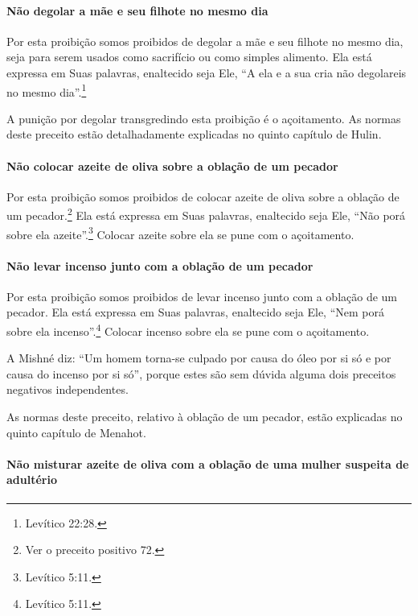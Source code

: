 \paragraph{Não degolar a mãe e seu filhote no mesmo dia}

Por esta proibição somos proibidos de degolar a mãe e seu filhote no
mesmo dia, seja para serem usados como sacrifício ou como simples
alimento. Ela está expressa em Suas palavras, enaltecido seja Ele, ``A
ela e a sua cria não degolareis no mesmo dia''.\footnote{Levítico 22:28.}

A punição por degolar transgredindo esta proibição é o açoitamento. As
normas deste preceito estão detalhadamente explicadas no quinto
capítulo de Hulin.

\paragraph{Não colocar azeite de oliva sobre a oblação de um pecador}

Por esta proibição somos proibidos de colocar azeite de oliva sobre a
oblação de um pecador.\footnote{Ver o preceito positivo 72.} Ela está expressa em Suas
palavras, enaltecido seja Ele, ``Não porá sobre ela azeite''.\footnote{Levítico
5:11.} Colocar azeite sobre ela se pune com o açoitamento.

\paragraph{Não levar incenso junto com a oblação de um pecador}

Por esta proibição somos proibidos de levar incenso junto com a oblação
de um pecador. Ela está expressa em Suas palavras, enaltecido seja Ele,
``Nem porá sobre ela incenso''.\footnote{Levítico 5:11.} Colocar incenso sobre
ela se pune com o açoitamento.

A Mishné diz: ``Um homem torna-se culpado por causa do óleo por si só e
por causa do incenso por si só'', porque estes são sem dúvida alguma
dois preceitos negativos independentes.

As normas deste preceito, relativo à oblação de um pecador, estão
explicadas no quinto capítulo de Menahot.

\paragraph{Não misturar azeite de oliva com a oblação de uma mulher suspeita de
adultério}

